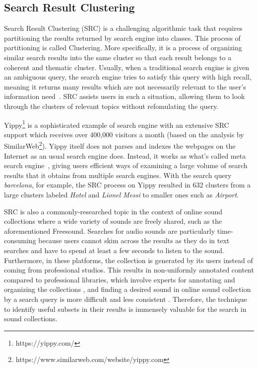 \subsection{Search Result Clustering}
Search Result Clustering (SRC) is a challenging algorithmic task that requires partitioning the results returned by search engine into classes. This process of partitioning is called Clustering. More specifically, it is a process of organizing similar search results into the same cluster so that each result belongs to a coherent and thematic cluster. Usually, when a traditional search engine is given an ambiguous query, the search engine tries to satisfy this query with high recall, meaning it returns many results which are not necessarily relevant to the user's information need~\cite{ugo2012}. SRC assists users in such a situation, allowing them to look through the clusters of relevant topics without refomulating the query.

Yippy\footnote{https://yippy.com/} is a sophisticated example of search engine with an extensive SRC support which receives over 400,000 visitors a month (based on the analysis by SimilarWeb\footnote{https://www.similarweb.com/website/yippy.com}). Yippy itself does not parses and indexes the webpages on the Internet as an usual search engine does. Instead, it works as what's called meta search engine~\cite{glover2000}, giving users efficient ways of examining a large volume of search results that it obtains from multiple search engines. With the search query \textit{barcelona}, for example, the SRC process on Yippy resulted in 632 clusters from a large clusters labeled \textit{Hotel} and \textit{Lionel Messi} to smaller ones such as \textit{Airport}.

SRC is also a commonly-researched topic in the context of online sound collections where a wide variety of sounds are freely shared, such as the aforementioned Freesound. Searches for audio sounds are particularly time-consuming because users cannot skim across the results as they do in text searches and have to spend at least a few seconds to listen to the sound. Furthermore, in these platforms, the collection is generated by its users instead of coming from professional studios. This results in non-uniformly annotated content compared to professional libraries, which involve experts for annotating and organizing the collections \cite{Frederic2018}, and finding a desired sound in online sound collection by a search query is more difficult and less consistent \cite{XavierIcassp2020}.
Therefore, the technique to identify useful subsets in their results is immensely valuable for the search in sound collections. 

